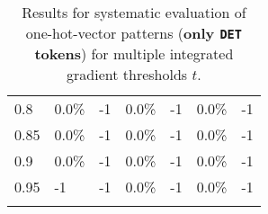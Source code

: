 \begin{table}[t]
\begin{tabular}{lllllll}
\multicolumn{1}{l|}{0.8}&  0.0\% & \multicolumn{1}{l|}{-1}& 0.0\% & \multicolumn{1}{l|}{-1}& 0.0\% & -1\\ 
\multicolumn{1}{l|}{0.85}&  0.0\% & \multicolumn{1}{l|}{-1}& 0.0\% & \multicolumn{1}{l|}{-1}& 0.0\% & -1\\ 
\multicolumn{1}{l|}{0.9}&  0.0\% & \multicolumn{1}{l|}{-1}& 0.0\% & \multicolumn{1}{l|}{-1}& 0.0\% & -1\\ 
\multicolumn{1}{l|}{0.95}&  -1 & \multicolumn{1}{l|}{-1}& 0.0\% & \multicolumn{1}{l|}{-1}& 0.0\% & -1\\ 


\\ \hline
\end{tabular}
\caption[Model Evaluation for only \texttt{DET} tokens]{Results for systematic evaluation of one-hot-vector patterns (\textbf{only \texttt{DET} tokens}) for multiple integrated gradient thresholds $t$.}
\label{tab:evalResultsDET}
\end{table}
	